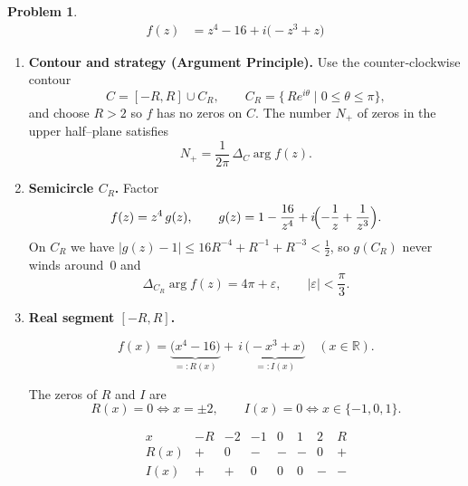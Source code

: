 \documentclass[12pt]{article}
\theoremstyle{definition} %
\newtheorem{problem}{Problem}
\theoremstyle{plain} %
\begin{document}
\renewcommand{\arraystretch}{1.2}   %

\begin{problem}
    \begin{align}
        f(z) &= z^{4}-16 + i\!\bigl(-z^{3}+z\bigr)
    \end{align}

    \begin{enumerate}
        \item \textbf{Contour and strategy (Argument Principle).}\;
              Use the counter‑clockwise contour
              \[
                  C=[-R,R]\cup C_R,
                  \qquad
                  C_R=\{\,Re^{i\theta}\mid 0\le\theta\le\pi\},
              \]
              and choose $R>2$ so $f$ has no zeros on $C$.
              The number $N_{+}$ of zeros in the upper half–plane satisfies
              \[
                  N_{+}=\frac{1}{2\pi}\,\Delta_{C}\arg f(z).
              \]

        \item \textbf{Semicircle $C_{R}$.}\;
              Factor
              \[
                  f(z)=z^{4}\,g(z),
                  \qquad
                  g(z)=1-\frac{16}{z^{4}}+i\!\Bigl(-\frac{1}{z}+\frac{1}{z^{3}}\Bigr).
              \]
              On $C_R$ we have $|g(z)-1|\le 16R^{-4}+R^{-1}+R^{-3}<\tfrac12$,
              so $g(C_R)$ never winds around $0$ and
              \[
                  \Delta_{C_R}\arg f(z)=4\pi+\varepsilon,
                  \qquad |\varepsilon|<\frac{\pi}{3}.
              \]

        \item \textbf{Real segment $[-R,R]$.}

              \[
                  f(x)=\underbrace{\bigl(x^{4}-16\bigr)}_{=:R(x)}
                       +\,i\,\underbrace{\bigl(-x^{3}+x\bigr)}_{=:I(x)}
                  \quad (x\in\mathbb R).
              \]

              The zeros of $R$ and $I$ are
              \[
                  R(x)=0\iff x=\pm2,
                  \qquad
                  I(x)=0\iff x\in\{-1,0,1\}.
              \]

              \[
              \begin{array}{c|ccccccc}
                  x & -R & -2 & -1 & 0 & 1 & 2 & R\\\hline
                  R(x) & + & 0 & - & - & - & 0 & +\\
                  I(x) & + & + & 0 & 0 & 0 & - & -
              \end{array}
              \]


\end{enumerate}
\end{problem}
\end{document}
